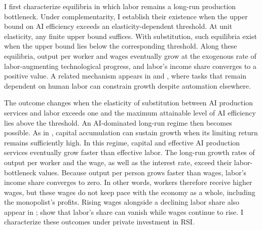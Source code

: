 I first characterize equilibria in which labor remains a long-run production bottleneck. Under complementarity, I establish their existence when the upper bound on AI efficiency exceeds an elasticity-dependent threshold. At unit elasticity, any finite upper bound suffices. With substitution, such equilibria exist when the upper bound lies below the corresponding threshold. Along these equilibria, output per worker and wages eventually grow at the exogenous rate of labor-augmenting technological progress, and labor's income share converges to a positive value. A related mechanism appears in \citet{aghionjonesjones2019} and \citet{jonestonetti2026}, where tasks that remain dependent on human labor can constrain growth despite automation elsewhere.

The outcome changes when the elasticity of substitution between AI production services and labor exceeds one and the maximum attainable level of AI efficiency lies above the threshold. An AI-dominated long-run regime then becomes possible. As in \citet{jonesmanuelli1990}, capital accumulation can sustain growth when its limiting return remains sufficiently high. In this regime, capital and effective AI production services eventually grow faster than effective labor. The long-run growth rates of output per worker and the wage, as well as the interest rate, exceed their labor-bottleneck values. Because output per person grows faster than wages, labor's income share converges to zero. %
In other words, workers therefore receive higher wages, but these wages do not keep pace with the economy as a whole, including the monopolist's profits.
Rising wages alongside a declining labor share also appear in
\citet{acemoglurestrepo2018}; \citet{raymookherjee2022} show that
labor's share can vanish while wages continue to rise. I characterize
these outcomes under private investment in RSI.


